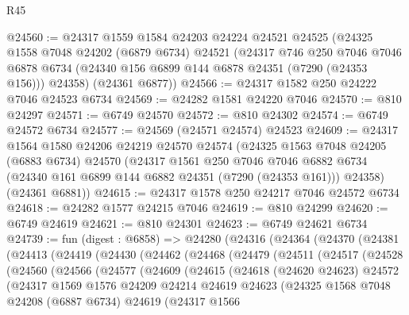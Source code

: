 \begin{lexlean}{R45}
\begin{coremodule}
{@24560 := @24317
    @1559
    @1584
    @24203
    @24224
    @24521
    @24525
    (@24325
      @1558
      @7048
      @24202
      (@6879 @6734)
      @24521
      (@24317
        @746
        @250
        @7046
        @7046
        @6878
        @6734
        (@24340 @156 @6899 @144 @6878 @24351 (@7290 (@24353 @156)))
        @24358)
      (@24361 @6877))
@24566 := @24317 @1582 @250 @24222 @7046 @24523 @6734
@24569 := @24282 @1581 @24220 @7046
@24570 := @810 @24297
@24571 := @6749 @24570
@24572 := @810 @24302
@24574 := @6749 @24572 @6734
@24577 := @24569 (@24571 @24574) @24523
@24609 := @24317
    @1564
    @1580
    @24206
    @24219
    @24570
    @24574
    (@24325
      @1563
      @7048
      @24205
      (@6883 @6734)
      @24570
      (@24317
        @1561
        @250
        @7046
        @7046
        @6882
        @6734
        (@24340 @161 @6899 @144 @6882 @24351 (@7290 (@24353 @161)))
        @24358)
      (@24361 @6881))
@24615 := @24317 @1578 @250 @24217 @7046 @24572 @6734
@24618 := @24282 @1577 @24215 @7046
@24619 := @810 @24299
@24620 := @6749 @24619
@24621 := @810 @24301
@24623 := @6749 @24621 @6734
@24739 := fun (digest : @6858) =>
  @24280
    (@24316
      (@24364
        (@24370
          (@24381
            (@24413
              (@24419
                (@24430
                  (@24462
                    (@24468
                      (@24479
                        (@24511
                          (@24517
                            (@24528
                              (@24560
                                (@24566
                                  (@24577
                                    (@24609
                                      (@24615
                                        (@24618
                                          (@24620 @24623)
                                          @24572
                                          (@24317
                                            @1569
                                            @1576
                                            @24209
                                            @24214
                                            @24619
                                            @24623
                                            (@24325
                                              @1568
                                              @7048
                                              @24208
                                              (@6887 @6734)
                                              @24619
                                              (@24317
                                                @1566
}
\end{coremodule}
\end{lexlean}
